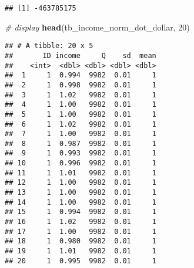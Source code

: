 \documentclass[
]{book}
\newenvironment{Shaded}{\begin{snugshade}}{\end{snugshade}}
\newcommand{\CommentTok}[1]{\textcolor[rgb]{0.56,0.35,0.01}{\textit{#1}}}
\newcommand{\DataTypeTok}[1]{\textcolor[rgb]{0.13,0.29,0.53}{#1}}
\newcommand{\DecValTok}[1]{\textcolor[rgb]{0.00,0.00,0.81}{#1}}
\newcommand{\KeywordTok}[1]{\textcolor[rgb]{0.13,0.29,0.53}{\textbf{#1}}}
\newcommand{\NormalTok}[1]{#1}
\newcommand{\OperatorTok}[1]{\textcolor[rgb]{0.81,0.36,0.00}{\textbf{#1}}}
\newcommand{\StringTok}[1]{\textcolor[rgb]{0.31,0.60,0.02}{#1}}
\begin{document}
\begin{verbatim}
## [1] -463785175
\end{verbatim}

\begin{Shaded}
\begin{Highlighting}[]
\CommentTok{# display}
\KeywordTok{head}\NormalTok{(tb_income_norm_dot_dollar, }\DecValTok{20}\NormalTok{)}
\end{Highlighting}
\end{Shaded}

\begin{verbatim}
## # A tibble: 20 x 5
##       ID income     Q    sd  mean
##    <int>  <dbl> <dbl> <dbl> <dbl>
##  1     1  0.994  9982  0.01     1
##  2     1  0.998  9982  0.01     1
##  3     1  1.02   9982  0.01     1
##  4     1  1.00   9982  0.01     1
##  5     1  1.00   9982  0.01     1
##  6     1  1.02   9982  0.01     1
##  7     1  1.00   9982  0.01     1
##  8     1  0.987  9982  0.01     1
##  9     1  0.993  9982  0.01     1
## 10     1  0.996  9982  0.01     1
## 11     1  1.01   9982  0.01     1
## 12     1  1.00   9982  0.01     1
## 13     1  1.00   9982  0.01     1
## 14     1  1.00   9982  0.01     1
## 15     1  0.994  9982  0.01     1
## 16     1  1.02   9982  0.01     1
## 17     1  1.00   9982  0.01     1
## 18     1  0.980  9982  0.01     1
## 19     1  1.01   9982  0.01     1
## 20     1  0.995  9982  0.01     1
\end{verbatim}

\begin{Shaded}
\end{Shaded}
\end{document}
